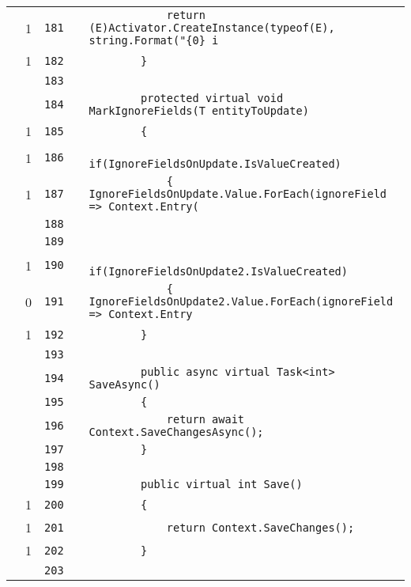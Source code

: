 \documentclass[a4paper,10pt]{article}
\begin{document}
\begin{longtable}[l]{lrrll}
\cellcolor{green} & 1 & \verb~181~ & & \verb~            return (E)Activator.CreateInstance(typeof(E), string.Format("{0} i~\\
\cellcolor{green} & 1 & \verb~182~ & & \verb~        }~\\
\cellcolor{gray} &  & \verb~183~ & & \verb~~\\
\cellcolor{gray} &  & \verb~184~ & & \verb~        protected virtual void MarkIgnoreFields(T entityToUpdate)~\\
\cellcolor{green} & 1 & \verb~185~ & & \verb~        {~\\
\cellcolor{green} & 1 & \verb~186~ & & \verb~            if(IgnoreFieldsOnUpdate.IsValueCreated)~\\
\cellcolor{green} & 1 & \verb~187~ & & \verb~            { IgnoreFieldsOnUpdate.Value.ForEach(ignoreField => Context.Entry(~\\
\cellcolor{gray} &  & \verb~188~ & & \verb~~\\
\cellcolor{gray} &  & \verb~189~ & & \verb~~\\
\cellcolor{green} & 1 & \verb~190~ & & \verb~            if(IgnoreFieldsOnUpdate2.IsValueCreated)~\\
\cellcolor{red} & 0 & \verb~191~ & & \verb~            { IgnoreFieldsOnUpdate2.Value.ForEach(ignoreField => Context.Entry~\\
\cellcolor{green} & 1 & \verb~192~ & & \verb~        }~\\
\cellcolor{gray} &  & \verb~193~ & & \verb~~\\
\cellcolor{gray} &  & \verb~194~ & & \verb~        public async virtual Task<int> SaveAsync()~\\
\cellcolor{gray} &  & \verb~195~ & & \verb~        {~\\
\cellcolor{gray} &  & \verb~196~ & & \verb~            return await Context.SaveChangesAsync();~\\
\cellcolor{gray} &  & \verb~197~ & & \verb~        }~\\
\cellcolor{gray} &  & \verb~198~ & & \verb~~\\
\cellcolor{gray} &  & \verb~199~ & & \verb~        public virtual int Save()~\\
\cellcolor{green} & 1 & \verb~200~ & & \verb~        {~\\
\cellcolor{green} & 1 & \verb~201~ & & \verb~            return Context.SaveChanges();~\\
\cellcolor{green} & 1 & \verb~202~ & & \verb~        }~\\
\cellcolor{gray} &  & \verb~203~ & & \verb~~\\

\end{longtable}
\end{document}
